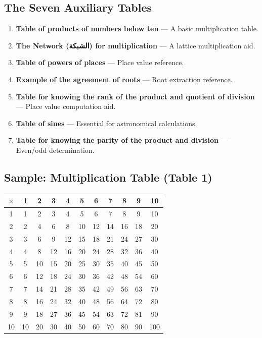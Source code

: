 \documentclass[11pt,a4paper]{article}
\newcommand{\ar}[1]{{\arabicfont\beginR #1\endR}}
\begin{document}
\subsection{The Seven Auxiliary Tables}

\begin{enumerate}[label=\textbf{Table \arabic*:}]
  \item \textbf{Table of products of numbers below ten} --- A basic
  multiplication table.
  \item \textbf{The Network (\ar{الشبكة}) for multiplication} --- A
  lattice multiplication aid.
  \item \textbf{Table of powers of places} --- Place value reference.
  \item \textbf{Example of the agreement of roots} --- Root extraction
  reference.
  \item \textbf{Table for knowing the rank of the product and quotient
  of division} --- Place value computation aid.
  \item \textbf{Table of sines} --- Essential for astronomical
  calculations.
  \item \textbf{Table for knowing the parity of the product and
  division} --- Even/odd determination.
\end{enumerate}

\subsection{Sample: Multiplication Table (Table 1)}

\begin{center}
\begin{tabular}{|c|cccccccccc|}
\hline
$\times$ & 1 & 2 & 3 & 4 & 5 & 6 & 7 & 8 & 9 & 10 \\
\hline
1 & 1 & 2 & 3 & 4 & 5 & 6 & 7 & 8 & 9 & 10 \\
2 & 2 & 4 & 6 & 8 & 10 & 12 & 14 & 16 & 18 & 20 \\
3 & 3 & 6 & 9 & 12 & 15 & 18 & 21 & 24 & 27 & 30 \\
4 & 4 & 8 & 12 & 16 & 20 & 24 & 28 & 32 & 36 & 40 \\
5 & 5 & 10 & 15 & 20 & 25 & 30 & 35 & 40 & 45 & 50 \\
6 & 6 & 12 & 18 & 24 & 30 & 36 & 42 & 48 & 54 & 60 \\
7 & 7 & 14 & 21 & 28 & 35 & 42 & 49 & 56 & 63 & 70 \\
8 & 8 & 16 & 24 & 32 & 40 & 48 & 56 & 64 & 72 & 80 \\
9 & 9 & 18 & 27 & 36 & 45 & 54 & 63 & 72 & 81 & 90 \\
10 & 10 & 20 & 30 & 40 & 50 & 60 & 70 & 80 & 90 & 100 \\
\hline
\end{tabular}
\end{center}
\clearpage
\end{document}
